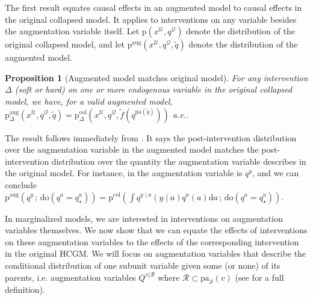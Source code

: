 \documentclass[12pt]{article}
\newtheorem{proposition}{Proposition}
\newcommand{\Sc}{\mathcal{S}}
\newcommand{\Uc}{\mathcal{U}}
\newcommand{\rmdo}{\mathrm{do}}
\newcommand{\s}{\, ; \,}
\newcommand{\di}{\mathrm{d}}
\newcommand{\pa}{\mathrm{pa}}
\newcommand{\pr}{\mathrm{p}}
\newcommand{\col}{\mathrm{col}}
\newcommand{\aug}{\mathrm{aug}}
\begin{document}
The first result equates causal effects in an augmented model to causal effects in the original collapsed model. It applies to interventions on any variable besides the augmentation variable itself.
Let $\pr(x^{\Uc},q^{\mathcal{Q}})$ denote the distribution of the original collapsed model, and let $\pr^{\mathrm{aug}}(x^{\Uc}, q^{\mathcal{Q}}, \tilde{q})$ denote the distribution of the augmented model.
\begin{proposition}[Augmented model matches original model] \label{prop:augment_valid}
For any intervention $\Delta$ (soft or hard) on one or more endogenous variable in the original collapsed model, we have, for a valid augmented model,
 $\pr_\Delta^{\mathrm{aug}}(x^{\Uc}, q^{\mathcal{Q}}, \tilde{q}) = \pr^\col_\Delta(x^{\Uc}, q^{\mathcal{Q}}, \tilde{f}(q^{\pa(\tilde{q})}))$ a.e..
\end{proposition}
\noindent The result follows immediately from . It says the post-intervention distribution over the augmentation variable in the augmented model matches the post-intervention distribution over the quantity the augmentation variable describes in the original model.
For instance, in  the augmentation variable is $q^y$, and we can conclude $\pr^\aug(q^y \s \rmdo(q^a = q^a_\star)) = \pr^\col(\int q^{y \mid a}(y \mid a) q^a(a) \di a \s  \rmdo(q^a = q^a_\star))$. 

In marginalized models, we are interested in interventions on augmentation variables themselves.
We now show that we can equate the effects of interventions on these augmentation variables to the effects of the corresponding intervention in the original HCGM. 
We will focus on  augmentation variables that describe the conditional distribution of one subunit variable given some (or none) of its parents, i.e. augmentation variables $Q^{v|\mathcal{R}}$ where $\mathcal{R} \subset \pa_\Sc(v)$ (see  for a full definition).
\end{document}
